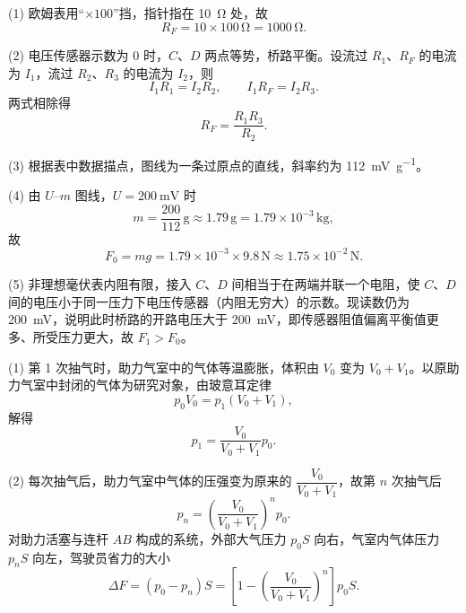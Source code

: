 \begin{answer}
(1) 欧姆表用“$\times100$”挡，指针指在 \SI{10}{\ohm} 处，故
\[
  R_{F}=10\times100\,\si{\ohm}=1000\,\si{\ohm}.
\]

(2) 电压传感器示数为 0 时，$C$、$D$ 两点等势，桥路平衡。设流过 $R_{1}$、$R_{F}$ 的电流为 $I_{1}$，流过 $R_{2}$、$R_{3}$ 的电流为 $I_{2}$，则
\[
  I_{1}R_{1}=I_{2}R_{2},\qquad I_{1}R_{F}=I_{2}R_{3}.
\]
两式相除得
\[
  R_{F}=\frac{R_{1}R_{3}}{R_{2}}.
\]

(3) 根据表中数据描点，图线为一条过原点的直线，斜率约为 \SI{112}{\milli\volt\per\gram}。


(4) 由 $U$--$m$ 图线，$U=\SI{200}{\milli\volt}$ 时
\[
  m=\frac{200}{112}\,\si{\gram}\approx1.79\,\si{\gram}
   =1.79\times10^{-3}\,\si{\kilogram},
\]
故
\[
  F_{0}=mg=1.79\times10^{-3}\times9.8\,\si{\newton}
      \approx1.75\times10^{-2}\,\si{\newton}.
\]

(5) 非理想毫伏表内阻有限，接入 $C$、$D$ 间相当于在两端并联一个电阻，使 $C$、$D$ 间的电压小于同一压力下电压传感器（内阻无穷大）的示数。现读数仍为 \SI{200}{\milli\volt}，说明此时桥路的开路电压大于 \SI{200}{\milli\volt}，即传感器阻值偏离平衡值更多、所受压力更大，故 $F_{1}>F_{0}$。

\end{answer}

\begin{answer}
(1) 第 1 次抽气时，助力气室中的气体等温膨胀，体积由 $V_{0}$ 变为 $V_{0}+V_{1}$。以原助力气室中封闭的气体为研究对象，由玻意耳定律
\[
  p_{0}V_{0}=p_{1}\left(V_{0}+V_{1}\right),
\]
解得
\[
  p_{1}=\frac{V_{0}}{V_{0}+V_{1}}p_{0}.
\]

(2) 每次抽气后，助力气室中气体的压强变为原来的 $\dfrac{V_{0}}{V_{0}+V_{1}}$，故第 $n$ 次抽气后
\[
  p_{n}=\left(\frac{V_{0}}{V_{0}+V_{1}}\right)^{n}p_{0}.
\]
对助力活塞与连杆 $AB$ 构成的系统，外部大气压力 $p_{0}S$ 向右，气室内气体压力 $p_{n}S$ 向左，驾驶员省力的大小
\[
  \Delta F=\left(p_{0}-p_{n}\right)S
  =\left[1-\left(\frac{V_{0}}{V_{0}+V_{1}}\right)^{n}\right]p_{0}S.
\]
\end{answer}

